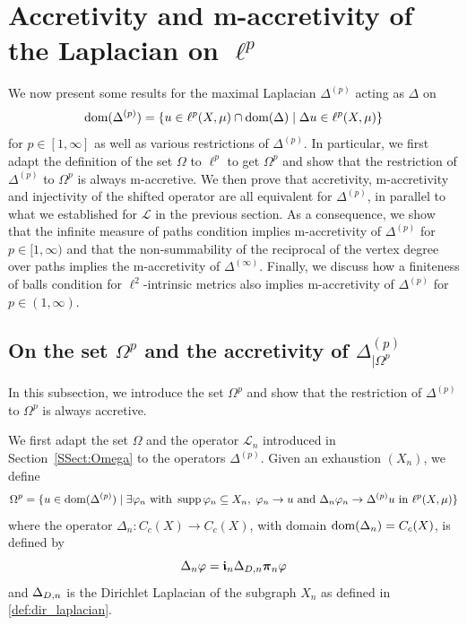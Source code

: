 \documentclass[letterpaper]{article}
\theoremstyle{definition}
\theoremstyle{named}
\numberwithin{equation}{section}
\newcommand{\dom}{\textnormal{dom}} %
\newcommand{\Deltaphi}{\mathcal{L}}
\newcommand{\Dep}{\Delta^{(p)}}
\newcommand{\Lmin}{\mathcal{L}_{n}}
\newcommand{\Deltadir}[1][]{\Delta_{D\ifx&#1&\else,#1\fi}}
\begin{document}
\section{\texorpdfstring{Accretivity and m-accretivity of the Laplacian on $\ell^p$}{Accretivity and m-accretivity of the Laplacian on ellp}}\label{s:Laplacian_accretivity}
We now present some results for the maximal Laplacian $\Delta^{(p)}$ acting as $\Delta$ on
$$\dom(\Dep) = \{ u \in \ell^p(X,\mu) \cap \dom(\Delta) \mid \Delta u \in \ell^p(X,\mu)\}$$
for $p \in [1,\infty]$ as well as various restrictions of $\Dep$.
In particular, we first adapt the definition of the set $\Omega$ to $\ell^p$ to get 
$\Omega^p$ and show that the restriction
of $\Delta^{(p)}$ to $\Omega^p$ is always m-accretive. We then prove that 
accretivity, m-accretivity and
injectivity of the shifted operator are all equivalent for $\Delta^{(p)}$, 
in parallel to what we
established for $\Deltaphi$ in the previous section. 
As a consequence, we show that the infinite measure of paths condition
implies m-accretivity of $\Delta^{(p)}$ for $p \in[1,\infty)$
and that the non-summability of the reciprocal of the vertex degree over paths
implies the m-accretivity of $\Delta^{(\infty)}$. 
Finally, we discuss how a finiteness of balls condition for $\ell^2$-intrinsic
metrics also implies m-accretivity of $\Delta^{(p)}$ for $p \in (1,\infty)$.


\subsection{\texorpdfstring{On the set $\Omega^p$ and the accretivity of $\Delta^{(p)}_{|\Omega^p}$}{On the set Omegap and the accretivity of Delta p on Omegap}}
In this subsection, we introduce the set $\Omega^p$ and show that 
the restriction of $\Dep$ to $\Omega^p$ is always accretive.

We first adapt the set $\Omega$ and the operator $\Lmin$ introduced in Section~\ref{SSect:Omega} to the operators $\Delta^{(p)}$. Given an exhaustion $(X_n)$, we define 
  \begin{equation}\label{eq:Omegap}
  \Omega^p = \{ u\in \dom(\Delta^{(p)}) \mid \exists \varphi_n \text{ with } \operatorname{supp}\varphi_n\subseteq X_n,\; \varphi_n \to u \text{ and } \Delta_n \varphi_n 
  \to \Delta^{(p)}u \text{ in } \ell^p(X,\mu)\}
  \end{equation} 
where the operator $\Delta_n\colon C_c(X) \to C_c(X)$, with domain $\dom(\Delta_n) = C_c(X)$,
is defined by 
\begin{equation}\label{eq:exhaustion_Lap}
 \Delta_n \varphi = \boldsymbol{\mathfrak{i}}_{n}\Deltadir[n]\boldsymbol{\pi}_{n} \varphi
\end{equation}
and $\Deltadir[n]$ is the Dirichlet Laplacian of the subgraph $X_n$ as defined in \eqref{def:dir_laplacian}.
\end{document}
